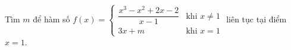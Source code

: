 \begin{ex}
Tìm $m$ để hàm số $f(x)=\begin{cases}\dfrac{x^3-x^2+2x-2}{x-1}&\text{khi }x\ne1\\3x+m&\text{khi }x=1\end{cases}$ liên tục tại điểm $x=1$.
\end{ex}
